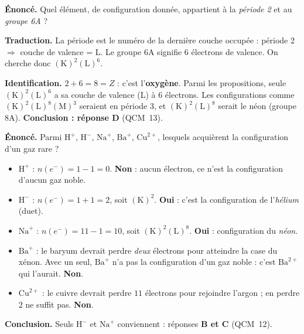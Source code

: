 \documentclass[11pt,a4paper]{article}
\newcommand{\ee}{e^{-}}      %
\renewcommand{\ne}{n(\ee)}   %
\begin{document}
\begin{exemple}
\textbf{Énoncé.} Quel élément, de configuration donnée, appartient à la \emph{période 2} et au
\emph{groupe 6A} ?

\smallskip
\textbf{Traduction.} La période est le numéro de la dernière couche occupée : période 2 $\Rightarrow$
couche de valence = L. Le groupe 6A signifie $6$ électrons de valence. On cherche donc
$(\mathrm{K})^2(\mathrm{L})^6$.

\smallskip
\textbf{Identification.} $2 + 6 = 8 = Z$ : c'est l'\textbf{oxygène}. Parmi les propositions, seule
$(\mathrm{K})^2(\mathrm{L})^6$ a sa couche de valence (L) à $6$ électrons. Les configurations comme
$(\mathrm{K})^2(\mathrm{L})^8(\mathrm{M})^3$ seraient en période 3, et $(\mathrm{K})^2(\mathrm{L})^8$
serait le néon (groupe 8A). \textbf{Conclusion : réponse D} (QCM~13).
\end{exemple}

\begin{exemple}
\textbf{Énoncé.} Parmi $\mathrm{H}^{+}$, $\mathrm{H}^{-}$, $\mathrm{Na}^{+}$, $\mathrm{Ba}^{+}$,
$\mathrm{Cu}^{2+}$, lesquels acquièrent la configuration d'un gaz rare ?
\begin{itemize}[leftmargin=1.6em,topsep=2pt,itemsep=3pt]
  \item $\mathrm{H}^{+}$ : $\ne = 1 - 1 = 0$. \;\textbf{\textcolor{attncol}{Non}} : aucun électron, ce
        n'est la configuration d'aucun gaz noble.
  \item $\mathrm{H}^{-}$ : $\ne = 1 + 1 = 2$, soit $(\mathrm{K})^2$. \;\textbf{\textcolor{excol}{Oui}} :
        c'est la configuration de l'\emph{hélium} (duet).
  \item $\mathrm{Na}^{+}$ : $\ne = 11 - 1 = 10$, soit $(\mathrm{K})^2(\mathrm{L})^8$.
        \;\textbf{\textcolor{excol}{Oui}} : configuration du \emph{néon}.
  \item $\mathrm{Ba}^{+}$ : le baryum devrait perdre \emph{deux} électrons pour atteindre la case du
        xénon. Avec un seul, $\mathrm{Ba}^{+}$ n'a pas la configuration d'un gaz noble : c'est
        $\mathrm{Ba}^{2+}$ qui l'aurait. \;\textbf{\textcolor{attncol}{Non}}.
  \item $\mathrm{Cu}^{2+}$ : le cuivre devrait perdre $11$ électrons pour rejoindre l'argon ; en
        perdre $2$ ne suffit pas. \;\textbf{\textcolor{attncol}{Non}}.
\end{itemize}
\textbf{Conclusion.} Seuls $\mathrm{H}^{-}$ et $\mathrm{Na}^{+}$ conviennent : réponses \textbf{B et C}
(QCM~12).
\end{exemple}
\end{document}
